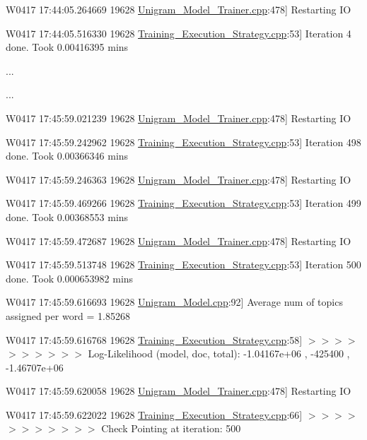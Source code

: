 {\ttfamily W0417 17:44:05.264669 19628 \hyperlink{_unigram___model___trainer_8cpp}{Unigram\_\-Model\_\-Trainer.cpp}:478\mbox{]} Restarting IO  }

{\ttfamily W0417 17:44:05.516330 19628 \hyperlink{_training___execution___strategy_8cpp}{Training\_\-Execution\_\-Strategy.cpp}:53\mbox{]} Iteration 4 done. Took 0.00416395 mins  }

{\ttfamily ... }

{\ttfamily ... }

{\ttfamily W0417 17:45:59.021239 19628 \hyperlink{_unigram___model___trainer_8cpp}{Unigram\_\-Model\_\-Trainer.cpp}:478\mbox{]} Restarting IO  }

{\ttfamily W0417 17:45:59.242962 19628 \hyperlink{_training___execution___strategy_8cpp}{Training\_\-Execution\_\-Strategy.cpp}:53\mbox{]} Iteration 498 done. Took 0.00366346 mins  }

{\ttfamily W0417 17:45:59.246363 19628 \hyperlink{_unigram___model___trainer_8cpp}{Unigram\_\-Model\_\-Trainer.cpp}:478\mbox{]} Restarting IO  }

{\ttfamily W0417 17:45:59.469266 19628 \hyperlink{_training___execution___strategy_8cpp}{Training\_\-Execution\_\-Strategy.cpp}:53\mbox{]} Iteration 499 done. Took 0.00368553 mins  }

{\ttfamily W0417 17:45:59.472687 19628 \hyperlink{_unigram___model___trainer_8cpp}{Unigram\_\-Model\_\-Trainer.cpp}:478\mbox{]} Restarting IO  }

{\ttfamily W0417 17:45:59.513748 19628 \hyperlink{_training___execution___strategy_8cpp}{Training\_\-Execution\_\-Strategy.cpp}:53\mbox{]} Iteration 500 done. Took 0.000653982 mins  }

{\ttfamily W0417 17:45:59.616693 19628 \hyperlink{_unigram___model_8cpp}{Unigram\_\-Model.cpp}:92\mbox{]} Average num of topics assigned per word = 1.85268  }

{\ttfamily W0417 17:45:59.616768 19628 \hyperlink{_training___execution___strategy_8cpp}{Training\_\-Execution\_\-Strategy.cpp}:58\mbox{]} $>$$>$$>$$>$$>$$>$$>$$>$$>$$>$ Log-\/Likelihood (model, doc, total): -\/1.04167e+06 , -\/425400 , -\/1.46707e+06  }

{\ttfamily W0417 17:45:59.620058 19628 \hyperlink{_unigram___model___trainer_8cpp}{Unigram\_\-Model\_\-Trainer.cpp}:478\mbox{]} Restarting IO  }

{\ttfamily W0417 17:45:59.622022 19628 \hyperlink{_training___execution___strategy_8cpp}{Training\_\-Execution\_\-Strategy.cpp}:66\mbox{]} $>$$>$$>$$>$$>$$>$$>$$>$$>$$>$$>$ Check Pointing at iteration: 500  }

